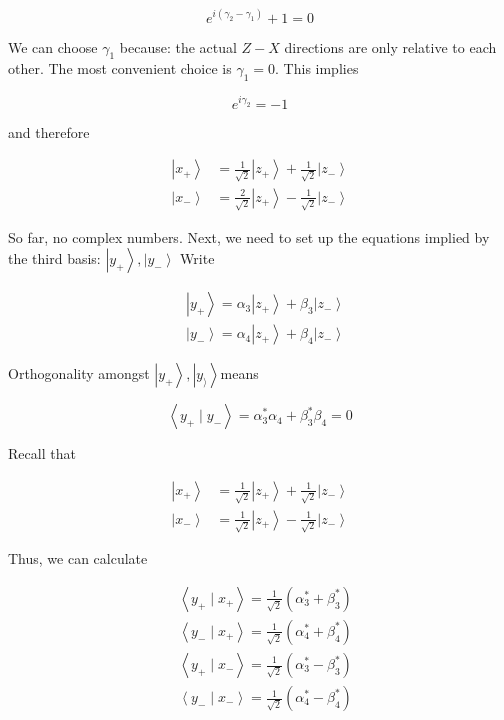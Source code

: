 \documentclass[main.tex]{subfiles}
\begin{document}
    $$
    e^{i\left(\gamma_{2}-\gamma_{1}\right)}+1=0
    $$
    
    We can choose $\gamma_{1}$ because: the actual $Z-X$ directions are only relative to each other. The most convenient choice is $\gamma_{1}=0$. This implies
    
    $$
    e^{i \gamma_{2}}=-1
    $$
    
    and therefore
    
    $$
    \begin{aligned}
    \left|x_{+}\right\rangle &=\frac{1}{\sqrt{2}}\left|z_{+}\right\rangle+\frac{1}{\sqrt{2}}\left|z_{-}\right\rangle \\
    \left|x_{-}\right\rangle &=\frac{2}{\sqrt{2}}\left|z_{+}\right\rangle-\frac{1}{\sqrt{2}}\left|z_{-}\right\rangle
    \end{aligned}
    $$
    
    So far, no complex numbers. Next, we need to set up the equations implied by the third basis: $\left|y_{+}\right\rangle,\left|y_{-}\right\rangle$ Write
    
    $$
    \begin{aligned}
    &\left|y_{+}\right\rangle=\alpha_{3}\left|z_{+}\right\rangle+\beta_{3}\left|z_{-}\right\rangle \\
    &\left|y_{-}\right\rangle=\alpha_{4}\left|z_{+}\right\rangle+\beta_{4}\left|z_{-}\right\rangle
    \end{aligned}
    $$
    
    Orthogonality amongst $\left|y_{+}\right\rangle,\left|y_{\rangle}\right\rangle$means
    
    $$
    \left\langle y_{+} \mid y_{-}\right\rangle=\alpha_{3}^{*} \alpha_{4}+\beta_{3}^{*} \beta_{4}=0
    $$
    
    Recall that
    
    $$
    \begin{aligned}
    \left|x_{+}\right\rangle &=\frac{1}{\sqrt{2}}\left|z_{+}\right\rangle+\frac{1}{\sqrt{2}}\left|z_{-}\right\rangle \\
    \left|x_{-}\right\rangle &=\frac{1}{\sqrt{2}}\left|z_{+}\right\rangle-\frac{1}{\sqrt{2}}\left|z_{-}\right\rangle
    \end{aligned}
    $$
    
    Thus, we can calculate
    
    $$
    \begin{aligned}
    &\left\langle y_{+} \mid x_{+}\right\rangle=\frac{1}{\sqrt{2}}\left(\alpha_{3}^{*}+\beta_{3}^{*}\right) \\
    &\left\langle y_{-} \mid x_{+}\right\rangle=\frac{1}{\sqrt{2}}\left(\alpha_{4}^{*}+\beta_{4}^{*}\right) \\
    &\left\langle y_{+} \mid x_{-}\right\rangle=\frac{1}{\sqrt{2}}\left(\alpha_{3}^{*}-\beta_{3}^{*}\right) \\
    &\left\langle y_{-} \mid x_{-}\right\rangle=\frac{1}{\sqrt{2}}\left(\alpha_{4}^{*}-\beta_{4}^{*}\right)
    \end{aligned}
    $$
    
\end{document}
